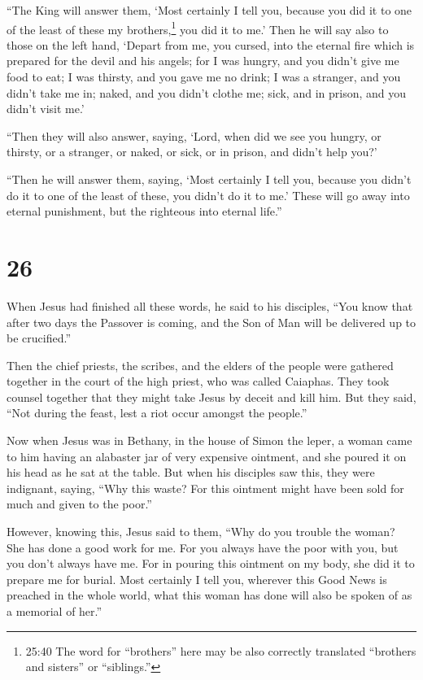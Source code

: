  ``The King will answer them, `Most certainly I tell you,
because you did it to one of the least of these my brothers,\footnote{25:40
  The word for ``brothers'' here may be also correctly translated
  ``brothers and sisters'' or ``siblings.''} you did it to me.'
 Then he will say also to those on the left hand, `Depart
from me, you cursed, into the eternal fire which is prepared for the
devil and his angels;  for I was hungry, and you didn't
give me food to eat; I was thirsty, and you gave me no drink;
 I was a stranger, and you didn't take me in; naked, and
you didn't clothe me; sick, and in prison, and you didn't visit me.'

 ``Then they will also answer, saying, `Lord, when did we
see you hungry, or thirsty, or a stranger, or naked, or sick, or in
prison, and didn't help you?'

 ``Then he will answer them, saying, `Most certainly I tell
you, because you didn't do it to one of the least of these, you didn't
do it to me.'  These will go away into eternal punishment,
but the righteous into eternal life.''

\hypertarget{section-25}{%
\section{26}\label{section-25}}

 When Jesus had finished all these words, he said to his
disciples,  ``You know that after two days the Passover is
coming, and the Son of Man will be delivered up to be crucified.''

 Then the chief priests, the scribes, and the elders of the
people were gathered together in the court of the high priest, who was
called Caiaphas.  They took counsel together that they might
take Jesus by deceit and kill him.  But they said, ``Not
during the feast, lest a riot occur amongst the people.''

 Now when Jesus was in Bethany, in the house of Simon the
leper,  a woman came to him having an alabaster jar of very
expensive ointment, and she poured it on his head as he sat at the
table.  But when his disciples saw this, they were
indignant, saying, ``Why this waste?  For this ointment
might have been sold for much and given to the poor.''

 However, knowing this, Jesus said to them, ``Why do you
trouble the woman? She has done a good work for me.  For
you always have the poor with you, but you don't always have me.
 For in pouring this ointment on my body, she did it to
prepare me for burial.  Most certainly I tell you, wherever
this Good News is preached in the whole world, what this woman has done
will also be spoken of as a memorial of her.''


